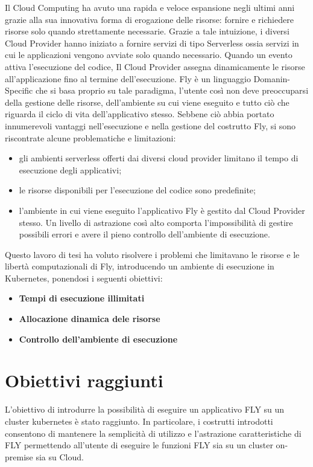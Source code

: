 Il Cloud Computing ha avuto una rapida e veloce espansione negli ultimi anni grazie alla sua innovativa forma di erogazione delle risorse: fornire e richiedere risorse solo quando strettamente necessarie.
Grazie a tale intuizione, i diversi Cloud Provider hanno iniziato a fornire servizi di tipo Serverless ossia servizi in cui le applicazioni vengono avviate solo quando necessario. Quando un evento attiva l'esecuzione del codice, Il Cloud Provider assegna dinamicamente le risorse all'applicazione fino al termine dell'esecuzione. 
Fly è un linguaggio Domanin-Specific che si basa proprio su tale paradigma, l'utente così non deve preoccuparsi della gestione delle risorse, dell'ambiente su cui viene eseguito e tutto ciò che riguarda il ciclo di vita dell'applicativo stesso.
Sebbene ciò abbia portato innumerevoli vantaggi nell'esecuzione e nella gestione del costrutto Fly, si sono riscontrate alcune problematiche e limitazioni:
\begin{itemize}
    \item gli ambienti serverless offerti dai diversi cloud provider limitano il tempo di esecuzione degli applicativi;
    \item le risorse disponibili per l'esecuzione del codice sono predefinite;
    \item l'ambiente in cui viene eseguito l'applicativo Fly è gestito dal Cloud Provider stesso. Un livello di astrazione così alto comporta l'impossibilità di gestire possibili errori e avere il pieno controllo dell'ambiente di esecuzione.
\end{itemize}

Questo lavoro di tesi ha voluto risolvere i problemi che limitavano le risorse e le libertà computazionali di Fly, introducendo un ambiente di esecuzione in Kubernetes, ponendosi i seguenti obiettivi:

\begin{itemize}
    \item \textbf{Tempi di esecuzione illimitati}
    \item \textbf{Allocazione dinamica dele risorse} 
    \item \textbf{Controllo dell'ambiente di esecuzione} 
\end{itemize}

\section{Obiettivi raggiunti}
L'obiettivo di introdurre la possibilità di eseguire un applicativo FLY su un cluster kubernetes è stato raggiunto. In particolare, i costrutti introdotti consentono di mantenere la semplicità di utilizzo e l'astrazione caratteristiche di FLY permettendo all'utente di eseguire le funzioni FLY sia su un cluster on-premise sia su Cloud.


